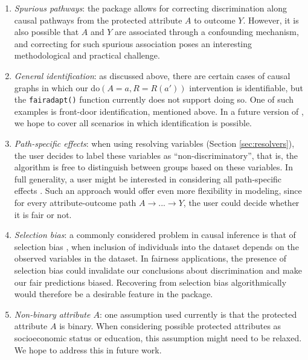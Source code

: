 \documentclass[
  nojss]{jss}
\begin{document}
\begin{enumerate}
\def\labelenumi{\arabic{enumi}.}
\item
  \emph{Spurious pathways}: the  package allows for
  correcting discrimination along causal pathways from the protected
  attribute \(A\) to outcome \(Y\). However, it is also possible that
  \(A\) and \(Y\) are associated through a confounding mechanism, and
  correcting for such spurious association poses an interesting
  methodological and practical challenge.
\item
  \emph{General identification}: as discussed above, there are certain
  cases of causal graphs in which our do\((A = a, R = R(a'))\)
  intervention is identifiable, but the \texttt{fairadapt()} function
  currently does not support doing so. One of such examples is
  front-door identification, mentioned above. In a future version of
  , we hope to cover all scenarios in which
  identification is possible.
\item
  \emph{Path-specific effects}: when using resolving variables (Section
  \ref{sec:resolvers}), the user decides to label these variables as
  ``non-discriminatory'', that is, the algorithm is free to distinguish
  between groups based on these variables. In full generality, a user
  might be interested in considering all path-specific effects
  \citep{avin2005identifiability}. Such an approach would offer even
  more flexibility in modeling, since for every attribute-outcome path
  \(A \rightarrow ... \rightarrow Y\), the user could decide whether it
  is fair or not.
\item
  \emph{Selection bias}: a commonly considered problem in causal
  inference is that of selection bias \citep{hernan2004structural}, when
  inclusion of individuals into the dataset depends on the observed
  variables in the dataset. In fairness applications, the presence of
  selection bias could invalidate our conclusions about discrimination
  and make our fair predictions biased. Recovering from selection bias
  algorithmically would therefore be a desirable feature in the
   package.
\item
  \emph{Non-binary attribute \(A\)}: one assumption used currently is
  that the protected attribute \(A\) is binary. When considering
  possible protected attributes as socioeconomic status or education,
  this assumption might need to be relaxed. We hope to address this in
  future work.
\end{enumerate}


\end{document}
